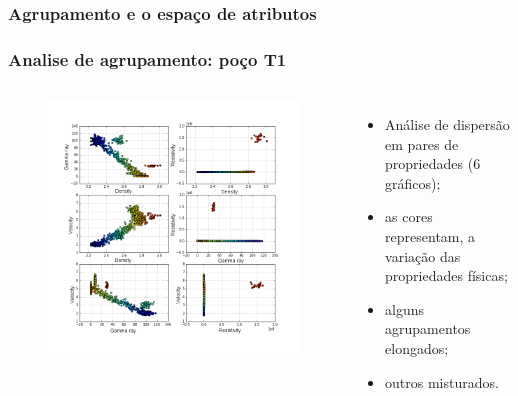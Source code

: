 \documentclass[aspectratio=10]{beamer} %
\begin{document}
\subsubsection{Agrupamento e o espaço de atributos}

\begin{frame}
	\frametitle{Analise de agrupamento: poço T1}
	\begin{columns}
		\footnotesize
		\justifying
		\begin{figure}
			\includegraphics[scale=0.268]{Imagens/cluterpocoT1.png}
		\end{figure}
		
		\begin{itemize}
			\footnotesize
			\item Análise de dispersão em pares de propriedades ($6$ gráficos);
			\pause
			\item as cores representam, a variação das propriedades físicas;
			\pause
			\item alguns agrupamentos elongados;
			\pause
			\item outros misturados.
		\end{itemize}
		
	\end{columns}
\end{frame}
\end{document}
